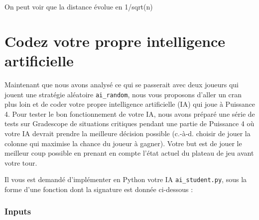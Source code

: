 \documentclass[11pt,answers]{exam}
\begin{document}
\begin{solutionbox}{25mm}
On peut voir que la distance évolue en 1/sqrt(n)

\end{solutionbox}

\newpage

\section{Codez votre propre intelligence artificielle}

Maintenant que nous avons analysé ce qui se passerait avec deux joueurs qui jouent une stratégie aléatoire \texttt{ai\_random}, nous vous proposons d’aller un cran plus loin et de coder votre propre intelligence artificielle (IA) qui joue à Puissance 4. 
Pour tester le bon fonctionnement de votre IA, nous avons préparé une série de tests sur Gradescope de situations critiques pendant une partie de Puissance 4 où votre IA devrait prendre la meilleure décision possible (c.-à-d. choisir de jouer la colonne qui maximise la chance du joueur à gagner). Votre but est de jouer le meilleur coup possible en prenant en compte l'état actuel du plateau de jeu avant votre tour.

\medskip

Il vous est demandé d'implémenter en Python votre IA \texttt{ai\_student.py}, sous la forme d'une fonction dont la signature est donnée ci-dessous :



\subsubsection*{Inputs}
\end{document}
